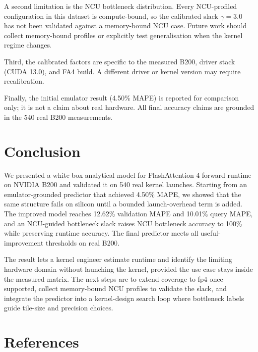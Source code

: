 \documentclass[
  11pt,
]{article}
\begin{document}
A second limitation is the NCU bottleneck distribution. Every
NCU-profiled configuration in this dataset is compute-bound, so the
calibrated slack \(\gamma = 3.0\) has not been validated against a
memory-bound NCU case. Future work should collect memory-bound profiles
or explicitly test generalisation when the kernel regime changes.

Third, the calibrated factors are specific to the measured B200, driver
stack (CUDA 13.0), and FA4 build. A different driver or kernel version
may require recalibration.

Finally, the initial emulator result (4.50\% MAPE) is reported for
comparison only; it is not a claim about real hardware. All final
accuracy claims are grounded in the 540 real B200 measurements.

\section{Conclusion}\label{conclusion}

We presented a white-box analytical model for FlashAttention-4 forward
runtime on NVIDIA B200 and validated it on 540 real kernel launches.
Starting from an emulator-grounded predictor that achieved 4.50\% MAPE,
we showed that the same structure fails on silicon until a bounded
launch-overhead term is added. The improved model reaches 12.62\%
validation MAPE and 10.01\% query MAPE, and an NCU-guided bottleneck
slack raises NCU bottleneck accuracy to 100\% while preserving runtime
accuracy. The final predictor meets all useful-improvement thresholds on
real B200.

The result lets a kernel engineer estimate runtime and identify the
limiting hardware domain without launching the kernel, provided the use
case stays inside the measured matrix. The next steps are to extend
coverage to fp4 once supported, collect memory-bound NCU profiles to
validate the slack, and integrate the predictor into a kernel-design
search loop where bottleneck labels guide tile-size and precision
choices.

\section{References}\label{references}
\end{document}
